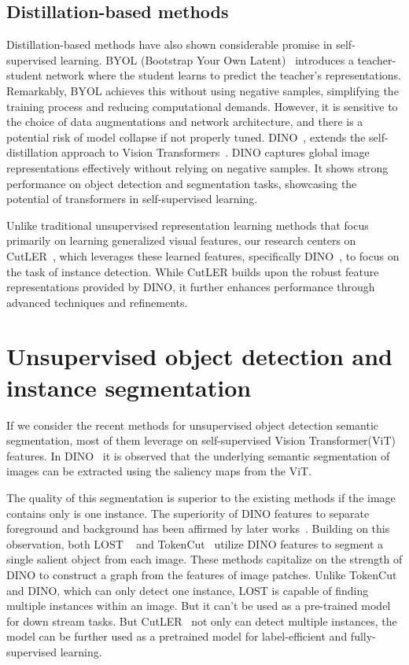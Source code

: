 \subsection{Distillation-based methods}
Distillation-based methods have also shown considerable promise in self-supervised learning. BYOL (Bootstrap Your Own Latent)~\cite{grill2020bootstrap} introduces a teacher-student network where the student learns to predict the teacher's representations. Remarkably, BYOL achieves this without using negative samples, simplifying the training process and reducing computational demands. However, it is sensitive to the choice of data augmentations and network architecture, and there is a potential risk of model collapse if not properly tuned. DINO~\cite{caron2021emerging}, extends the self-distillation approach to Vision Transformers~\cite{dosovitskiy2020image}. DINO captures global image representations effectively without relying on negative samples. It shows strong performance on object detection and segmentation tasks, showcasing the potential of transformers in self-supervised learning.

Unlike traditional unsupervised representation learning methods that focus primarily on learning generalized visual features, our research centers on CutLER~\cite{wang2023cut}, which leverages these learned features, specifically DINO~\cite{caron2021emerging}, to focus on the task of instance detection. While CutLER builds upon the robust feature representations provided by DINO, it further enhances performance through advanced techniques and refinements.

\section{Unsupervised object detection and instance segmentation}
If we consider the recent methods for unsupervised object detection semantic segmentation, most of them leverage on self-supervised Vision Transformer(ViT)~\cite{dosovitskiy2020image} features. In DINO~\cite{caron2021emerging} it is observed that the underlying semantic segmentation of images can be extracted using the saliency maps from the ViT. 

The quality of this segmentation is superior to the existing methods if the image contains only is one instance. The superiority of DINO features to separate foreground and background has been affirmed by later works~\cite{engstler2023understanding}. Building on this observation, both LOST ~\cite{simeoni2021localizing} and TokenCut~\cite{wang2022tokencut} utilize DINO features to segment a single salient object from each image. These methods capitalize on the strength of DINO to construct a graph from the features of image patches. Unlike TokenCut and DINO, which can only detect one instance, LOST is capable of finding multiple instances within an image. But it can't be used as a pre-trained model for down stream tasks. But CutLER~\cite{wang2023cut} not only can detect multiple instances, the model can be further used as a pretrained model for label-efficient and fully-supervised learning.

